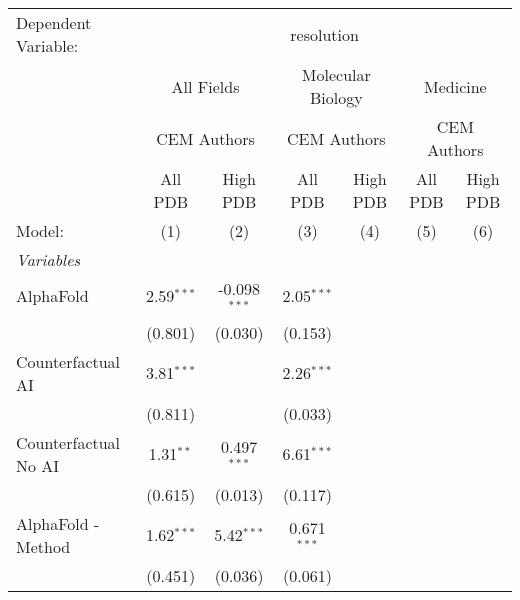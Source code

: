\begingroup
\centering
\begin{tabular}{lcccccc}
   \tabularnewline \midrule \midrule
   Dependent Variable: & \multicolumn{6}{c}{resolution}\\
 & \multicolumn{2}{c}{All Fields} & \multicolumn{2}{c}{Molecular Biology} & \multicolumn{2}{c}{Medicine} \\
\cmidrule(lr){2-3} \cmidrule(lr){4-5} \cmidrule(lr){6-7}
 & \multicolumn{2}{c}{CEM Authors} & \multicolumn{2}{c}{CEM Authors} & \multicolumn{2}{c}{CEM Authors} \\
\cmidrule(lr){2-3} \cmidrule(lr){4-5} \cmidrule(lr){6-7}
 & \multicolumn{1}{c}{All PDB} & \multicolumn{1}{c}{High PDB} & \multicolumn{1}{c}{All PDB} & \multicolumn{1}{c}{High PDB} & \multicolumn{1}{c}{All PDB} & \multicolumn{1}{c}{High PDB} \\
\cmidrule(lr){2-2} \cmidrule(lr){3-3} \cmidrule(lr){4-4} \cmidrule(lr){5-5} \cmidrule(lr){6-6} \cmidrule(lr){7-7}
   Model:                                                     & (1)           & (2)            & (3)           & (4) & (5) & (6)\\  
   \midrule
   \emph{Variables}\\
   AlphaFold                                                  & 2.59$^{***}$  & -0.098$^{***}$ & 2.05$^{***}$  &     &     &   \\   
                                                              & (0.801)       & (0.030)        & (0.153)       &     &     &   \\   
   Counterfactual AI                                          & 3.81$^{***}$  &                & 2.26$^{***}$  &     &     &   \\   
                                                              & (0.811)       &                & (0.033)       &     &     &   \\   
   Counterfactual No AI                                       & 1.31$^{**}$   & 0.497$^{***}$  & 6.61$^{***}$  &     &     &   \\   
                                                              & (0.615)       & (0.013)        & (0.117)       &     &     &   \\   
   AlphaFold - Method                                         & 1.62$^{***}$  & 5.42$^{***}$   & 0.671$^{***}$ &     &     &   \\   
                                                              & (0.451)       & (0.036)        & (0.061)       &     &     &   \\   

\end{tabular}
